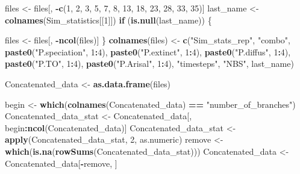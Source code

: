 \documentclass[]{book}
\newenvironment{Shaded}{\begin{snugshade}}{\end{snugshade}}
\newcommand{\KeywordTok}[1]{\textcolor[rgb]{0.13,0.29,0.53}{\textbf{{#1}}}}
\newcommand{\DecValTok}[1]{\textcolor[rgb]{0.00,0.00,0.81}{{#1}}}
\newcommand{\StringTok}[1]{\textcolor[rgb]{0.31,0.60,0.02}{{#1}}}
\newcommand{\ControlFlowTok}[1]{\textcolor[rgb]{0.13,0.29,0.53}{\textbf{{#1}}}}
\newcommand{\OperatorTok}[1]{\textcolor[rgb]{0.81,0.36,0.00}{\textbf{{#1}}}}
\newcommand{\NormalTok}[1]{{#1}}
\theoremstyle{definition}
\theoremstyle{definition}
\theoremstyle{definition}
\theoremstyle{remark}
\begin{document}
\begin{Shaded}
\begin{Highlighting}[]
\NormalTok{ files <-}\StringTok{ }\NormalTok{files[, }\OperatorTok{-}\KeywordTok{c}\NormalTok{(}\DecValTok{1}\NormalTok{, }\DecValTok{2}\NormalTok{, }\DecValTok{3}\NormalTok{, }\DecValTok{5}\NormalTok{, }\DecValTok{7}\NormalTok{, }\DecValTok{8}\NormalTok{, }\DecValTok{13}\NormalTok{, }\DecValTok{18}\NormalTok{, }\DecValTok{23}\NormalTok{, }\DecValTok{28}\NormalTok{, }\DecValTok{33}\NormalTok{, }\DecValTok{35}\NormalTok{)]}
\NormalTok{ last_name <-}\StringTok{ }\KeywordTok{colnames}\NormalTok{(Sim_statistics[[}\DecValTok{1}\NormalTok{]])}
 \ControlFlowTok{if}\NormalTok{ (}\KeywordTok{is.null}\NormalTok{(last_name)) \{}

\NormalTok{   files <-}\StringTok{ }\NormalTok{files[, }\OperatorTok{-}\KeywordTok{ncol}\NormalTok{(files)]}
\NormalTok{ \}}
 \KeywordTok{colnames}\NormalTok{(files) <-}\StringTok{  }\KeywordTok{c}\NormalTok{(}\StringTok{"Sim_stats_rep"}\NormalTok{, }\StringTok{"combo"}\NormalTok{, }\KeywordTok{paste0}\NormalTok{(}\StringTok{"P.speciation"}\NormalTok{, }\DecValTok{1}\OperatorTok{:}\DecValTok{4}\NormalTok{),}
                       \KeywordTok{paste0}\NormalTok{(}\StringTok{"P.extinct"}\NormalTok{, }\DecValTok{1}\OperatorTok{:}\DecValTok{4}\NormalTok{),  }\KeywordTok{paste0}\NormalTok{(}\StringTok{"P.diffus"}\NormalTok{, }\DecValTok{1}\OperatorTok{:}\DecValTok{4}\NormalTok{),}
                       \KeywordTok{paste0}\NormalTok{(}\StringTok{"P.TO"}\NormalTok{, }\DecValTok{1}\OperatorTok{:}\DecValTok{4}\NormalTok{),  }\KeywordTok{paste0}\NormalTok{(}\StringTok{"P.Arisal"}\NormalTok{, }\DecValTok{1}\OperatorTok{:}\DecValTok{4}\NormalTok{), }
                       \StringTok{"timesteps"}\NormalTok{, }\StringTok{"NBS"}\NormalTok{, last_name)}

\NormalTok{ Concatenated_data <-}\StringTok{ }\KeywordTok{as.data.frame}\NormalTok{(files)}

\NormalTok{ begin <-}\StringTok{ }\KeywordTok{which}\NormalTok{(}\KeywordTok{colnames}\NormalTok{(Concatenated_data) }\OperatorTok{==}\StringTok{  "number_of_branches"}\NormalTok{)}
\NormalTok{ Concatenated_data_stat <-}\StringTok{ }\NormalTok{Concatenated_data[, begin}\OperatorTok{:}\KeywordTok{ncol}\NormalTok{(Concatenated_data)]}
\NormalTok{ Concatenated_data_stat <-}\StringTok{ }\KeywordTok{apply}\NormalTok{(Concatenated_data_stat, }\DecValTok{2}\NormalTok{, as.numeric)}
\NormalTok{ remove <-}\StringTok{ }\KeywordTok{which}\NormalTok{(}\KeywordTok{is.na}\NormalTok{(}\KeywordTok{rowSums}\NormalTok{(Concatenated_data_stat)))}
\NormalTok{ Concatenated_data <-}\StringTok{ }\NormalTok{Concatenated_data[}\OperatorTok{-}\NormalTok{remove, ]}


\end{Highlighting}
\end{Shaded}
\end{document}

